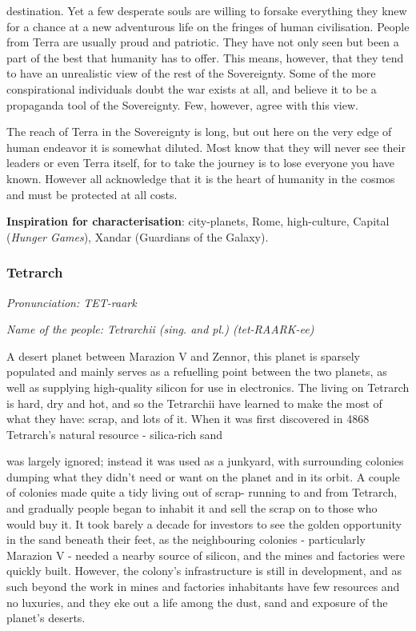 destination. Yet a few desperate souls are willing to forsake everything they knew for a chance at a new adventurous life on the fringes of human civilisation. People from Terra are usually proud and patriotic. They have not only seen but been a part of the best that humanity has to offer. This means, however, that they tend to have an unrealistic view of the rest of the Sovereignty. Some of the more conspirational individuals doubt the war exists at all, and believe it to be a propaganda tool of the Sovereignty. Few, however, agree with this view.

The reach of Terra in the Sovereignty is long, but out here on the very edge of human endeavor it is somewhat diluted. Most know that they will never see their leaders or even Terra itself, for to take the journey is to lose everyone you have known. However all acknowledge that it is the heart of humanity in the cosmos and must be protected at all costs.

\textbf{Inspiration for characterisation}: city-planets, Rome, high-culture, Capital (\textit{Hunger Games}), Xandar (Guardians of the Galaxy).

\subsubsection{Tetrarch}

\textit{Pronunciation: TET-raark}

\textit{Name of the people: Tetrarchii (sing. and pl.) (tet-RAARK-ee)}

A desert planet between Marazion V and Zennor, this planet is sparsely populated and mainly serves as a refuelling point between the two planets, as well as supplying high-quality silicon for use in electronics. The living on Tetrarch is hard, dry and hot, and so the Tetrarchii have learned to make the most of what they have: scrap, and lots of it. When it was first discovered in 4868 Tetrarch's natural resource - silica-rich sand

was largely ignored; instead it was used as a junkyard, with surrounding colonies dumping what they didn't need or want on the planet and in its orbit. A couple of colonies made quite a tidy living out of scrap- running to and from Tetrarch, and gradually people began to inhabit it and sell the scrap on to those who would buy it. It took barely a decade for investors to see the golden opportunity in the sand beneath their feet, as the neighbouring colonies - particularly Marazion V - needed a nearby source of silicon, and the mines and factories were quickly built. However, the colony's infrastructure is still in development, and as such beyond the work in mines and factories inhabitants have few resources and no luxuries, and they eke out a life among the dust, sand and exposure of the planet's deserts.

